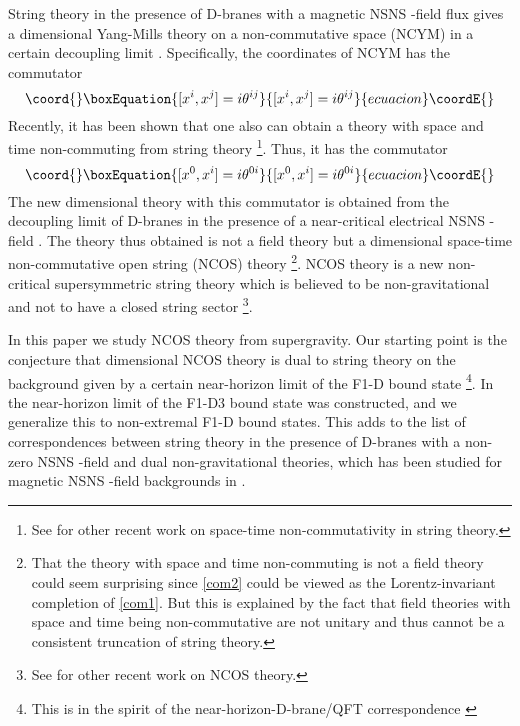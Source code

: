 \documentclass[a4paper,twoside,titlepage,12pt]{article}
\begin{document}
String theory in the presence of D\coordHE{}-branes 
with a magnetic NSNS \coordHE{}-field flux gives
a \coordHE{} dimensional Yang-Mills theory 
on a non-commutative space (NCYM) in a 
certain decoupling limit \cite{Connes:1998cr,Seiberg:1999vs}.
Specifically, the coordinates of NCYM has the commutator
%
\begin{equation}\coord{}\boxEquation{
\label{com1}
[ x^i, x^j ] = i \theta^{ij} 
}{
[ x^i, x^j ] = i \theta^{ij} 
}{ecuacion}\coordE{}\end{equation}
%
Recently, it has been shown that one also can obtain a theory
with space and time non-commuting from string theory 
\cite{Seiberg:2000ms,Gopakumar:2000na}%
\footnote{See \cite{Seiberg:2000gc,Barbon:2000sg}
for other recent work on space-time
non-commutativity in string theory.}.
Thus, it has the commutator
%
\begin{equation}\coord{}\boxEquation{
\label{com2}
[ x^0 , x^i ] = i \theta^{0i}
}{
[ x^0 , x^i ] = i \theta^{0i}
}{ecuacion}\coordE{}\end{equation}
%
The new \coordHE{} dimensional theory with this commutator is obtained
from the decoupling limit of D\coordHE{}-branes in the presence of a near-critical 
electrical NSNS \coordHE{}-field \cite{Seiberg:2000ms,Gopakumar:2000na}.
The theory thus obtained is not a field theory but a \coordHE{} dimensional 
space-time non-commutative open string (NCOS) theory 
\cite{Seiberg:2000ms,Gopakumar:2000na}%
\footnote{That the theory with space and time 
non-commuting is not a field theory
could seem surprising since \eqref{com2} could be viewed
as the Lorentz-invariant completion of \eqref{com1}. 
But this is explained by the fact that 
field theories with space and time being non-commutative
are not unitary and thus cannot be a 
consistent truncation of string theory\cite{Gomis:2000zz}.}. 
NCOS theory is a new non-critical supersymmetric string 
theory which is believed to be non-gravitational and not to have 
a closed string sector \cite{Seiberg:2000ms,Gopakumar:2000na}%
\footnote{See \cite{Chen:2000ny} for other recent work on NCOS theory.}.

In this paper we study NCOS theory from supergravity.
Our starting point is the conjecture 
that \coordHE{} dimensional NCOS theory is dual to 
string theory on the background given by 
a certain near-horizon limit of the F1-D\coordHE{} 
bound state \cite{Gopakumar:2000na}%
\footnote{This is in the spirit of the near-horizon-D\coordHE{}-brane/QFT
correspondence \cite{Maldacena:1997re,Itzhaki:1998dd,Aharony:1999ti}}.
In \cite{Gopakumar:2000na} the near-horizon limit of the
F1-D3 bound state was constructed, and we generalize 
this to non-extremal F1-D\coordHE{} bound states.
This adds to the list of correspondences
between string theory in the presence of D\coordHE{}-branes with a non-zero
NSNS \coordHE{}-field and dual non-gravitational theories, which has been
studied for magnetic NSNS \coordHE{}-field backgrounds in 
\cite{Maldacena:1999mh,Hashimoto:1999ut,Li:1999am,Alishahiha:1999ci,Harmark:1999rb,Lu:1999rm,Cai:2000hn}.
\end{document}

